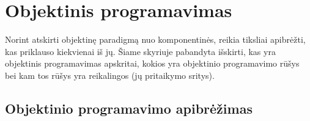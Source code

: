 \chapter{Objektinis programavimas}

Norint atskirti objektinę paradigmą nuo komponentinės, reikia
tiksliai apibrėžti, kas priklauso kiekvienai iš jų.
Šiame skyriuje pabandyta išskirti, kas yra objektinis programavimas
apskritai, kokios yra objektinio programavimo rūšys bei kam
tos rūšys yra reikalingos (jų pritaikymo sritys).

\section{Objektinio programavimo apibrėžimas}

